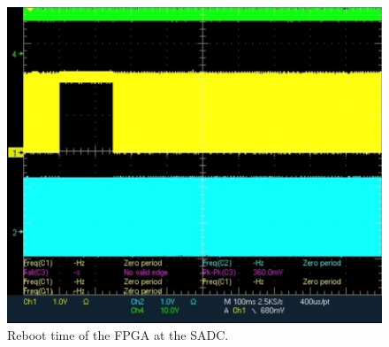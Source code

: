 \documentclass[12pt,a4paper, twocolumn]{article}
\begin{document}
\begin{figure}[htb]
\includegraphics[width=\linewidth, trim={0 0 0 0}, clip]{fig/FPGAReboot.png}
\caption{\label{fig:sadc:fpga_rbt}Reboot time of the FPGA at the SADC.}
\end{figure}
\end{document}
